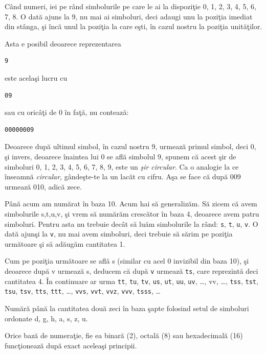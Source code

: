 Când numeri, iei pe rând simbolurile pe care le ai la dispoziţie 0, 1, 2, 3, 4, 5, 6, 7, 8.
O dată ajuns la 9, nu mai ai simboluri, deci adaugi unu la poziţia imediat din
stânga, şi încă unul la poziţia la care eşti, în cazul nostru la poziţia unităţilor.

Asta e posibil deoarece reprezentarea
\begin{verbatim}
9
\end{verbatim}
este acelaşi lucru cu
\begin{verbatim}
09
\end{verbatim}
sau cu oricâţi de 0 în faţă, nu contează:
\begin{verbatim}
00000009
\end{verbatim}
Deoarece după ultimul simbol, în cazul nostru 9, urmează primul simbol, deci 0, şi invers,
deoarece înaintea lui 0 se află simbolul 9, spunem că acest şir de simboluri
0, 1, 2, 3, 4, 5, 6, 7, 8, 9, este un \textsl{şir circular}. Ca o analogie
la ce înseamnă \textit{circular}, gândeşte-te la un lacăt cu cifru.
Aşa se face că după 009 urmează 010, adică zece.

Până acum am numărat în baza 10. Acum hai să generalizăm. Să zicem că avem
simbolurile s,t,u,v, şi vrem să numărăm crescător în baza 4, deoarece avem
patru simboluri. Pentru asta nu trebuie decât să luăm simbolurile la rând:
\texttt{s}, \texttt{t}, \texttt{u}, \texttt{v}.
O dată ajunşi la \texttt{v}, nu mai avem simboluri, deci trebuie să sărim
pe poziţia următoare şi să adăugăm cantitatea 1.

Cum pe poziţia următoare
se află s (similar cu acel 0 {\glqq}invizibil{\grqq} din baza 10), şi deoarece după v
urmează s, deducem că după \texttt{v} urmează \texttt{ts}, care reprezintă
deci cantitatea 4. În continuare ar urma
\texttt{tt}, \texttt{tu}, \texttt{tv}, 
\texttt{us}, \texttt{ut}, \texttt{uu}, \texttt{uv}, \ldots, vv, \ldots,
\texttt{tss}, \texttt{tst}, \texttt{tsu}, \texttt{tsv},
\texttt{tts}, \texttt{ttt}, \ldots, \texttt{vvs}, \texttt{vvt},
\texttt{vvz}, \texttt{vvv}, \texttt{tsss}, \ldots

\begin{Exercise}[title={Numără în baza şapte},difficulty=2]
Numără până la cantitatea două zeci în baza şapte folosind setul
de simboluri ordonate d, g, h, a, s, z, u.
\end{Exercise}

Orice bază de numeraţie, fie ea binară (2), octală (8) sau
hexadecimală (16) funcţionează după exact aceleaşi principii.

